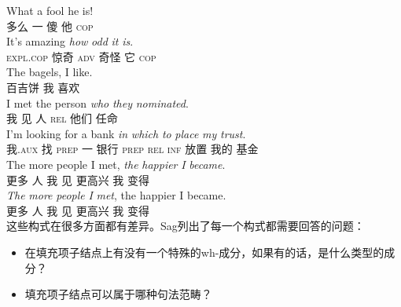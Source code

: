 \begin{exe}
\begin{xlist}[iv.]
\begin{exe}
\begin{xlist}[iv.]
\eal
\ex
\gll What a fool he is!\\
     多么 一 傻 他 \textsc{cop}\\
\ex
\gll It's amazing \emph{how} \emph{odd} \emph{it} \emph{is}.\\
     \textsc{expl}.\textsc{cop} 惊奇 \textsc{adv} 奇怪 它 \textsc{cop}\\
\zl
\ea
\gll The bagels, I like.\\
      百吉饼 我 喜欢\\
\z
\eal
\ex
\gll I met the person \emph{who} \emph{they} \emph{nominated}.\\
     我 见  人 \textsc{rel} 他们 任命\\
\ex
\gll I'm looking for a bank \emph{in} \emph{which} \emph{to} \emph{place} \emph{my} \emph{trust}.\\
     我.\textsc{aux} 找 \textsc{prep} 一 银行 \textsc{prep} \textsc{rel} \textsc{inf} 放置 我的 基金\\
\zl
\eal
\ex
\gll The more people I met, \emph{the} \emph{happier} \emph{I} \emph{became}.\\
      更多 人 我 见  更高兴 我 变得\\
\ex 
\gll \emph{The} \emph{more} \emph{people} \emph{I} \emph{met}, the happier I became.\\
      更多 人 我 见  更高兴 我 变得\\
\zl
这些构式在很多方面都有差异。Sag列出了每一个构式都需要回答的问题：
\begin{itemize}
\item 在填充项子结点上有没有一个特殊的wh-成分，如果有的话，是什么类型的成分？
\item 填充项子结点可以属于哪种句法范畴？

\end{itemize}
\end{xlist}
\end{exe}
\end{xlist}
\end{exe}
